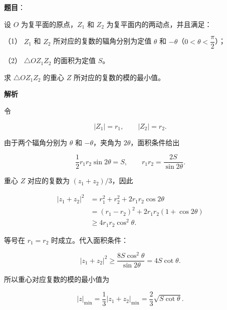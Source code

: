\begin{answer}

\textbf{题目}：

设 $O$ 为复平面的原点，$Z_1$ 和 $Z_2$ 为复平面内的两动点，并且满足：

（1） $Z_1$ 和 $Z_2$ 所对应的复数的辐角分别为定值 $\theta$ 和 $-\theta$（$0<\theta<\dfrac\pi2$）；

（2） $\triangle OZ_1Z_2$ 的面积为定值 $S$。

求 $\triangle OZ_1Z_2$ 的重心 $Z$ 所对应的复数的模的最小值。

\textbf{解析}


令

\nopagebreak[4]
\[
|Z_1|=r_1,\qquad |Z_2|=r_2.
\]

由于两个辐角分别为 $\theta$ 和 $-\theta$，夹角为 $2\theta$，面积条件给出

\nopagebreak[4]
\[
\frac12r_1r_2\sin2\theta=S,
\qquad
r_1r_2=\frac{2S}{\sin2\theta}.
\]


重心 $Z$ 对应的复数为 $(z_1+z_2)/3$，因此

\nopagebreak[4]
\[
\begin{aligned}
|z_1+z_2|^2
&=r_1^2+r_2^2+2r_1r_2\cos2\theta\\
&=(r_1-r_2)^2+2r_1r_2(1+\cos2\theta)\\
&\ge4r_1r_2\cos^2\theta.
\end{aligned}
\]

等号在 $r_1=r_2$ 时成立。代入面积条件：

\nopagebreak[4]
\[
|z_1+z_2|^2
\ge\frac{8S\cos^2\theta}{\sin2\theta}
=4S\cot\theta.
\]

所以重心对应复数的模的最小值为

\nopagebreak[4]
\[
|z|_{\min}=\frac13|z_1+z_2|_{\min}
=\frac23\sqrt{S\cot\theta}.
\]



\end{answer}
